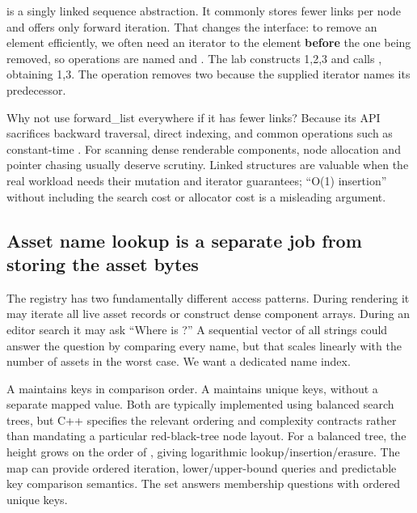  is a singly linked sequence abstraction. It commonly stores fewer links per node and offers only forward iteration. That changes the interface: to remove an element efficiently, we often need an iterator to the element \textbf{before} the one being removed, so operations are named  and . The lab constructs 1,2,3 and calls , obtaining 1,3. The operation removes two because the supplied iterator names its predecessor.

Why not use forward\_list everywhere if it has fewer links? Because its API sacrifices backward traversal, direct indexing, and common operations such as constant-time . For scanning dense renderable components, node allocation and pointer chasing usually deserve scrutiny. Linked structures are valuable when the real workload needs their mutation and iterator guarantees; ``O(1) insertion'' without including the search cost or allocator cost is a misleading argument.

\subsection{Asset name lookup is a separate job from storing the asset bytes}\label{05-engine-i-ch005-asset-name-lookup-is-a-separate-job-from-storing-the-asset-bytes}

\hypertarget{05-engine-i-ch005-asset-name-lookup-is-a-separate-job-from-storing-the-asset-bytes}{}

The registry has two fundamentally different access patterns. During rendering it may iterate all live asset records or construct dense component arrays. During an editor search it may ask ``Where is ?'' A sequential vector of all strings could answer the question by comparing every name, but that scales linearly with the number of assets in the worst case. We want a dedicated name index.

A  maintains keys in comparison order. A  maintains unique keys, without a separate mapped value. Both are typically implemented using balanced search trees, but C++ specifies the relevant ordering and complexity contracts rather than mandating a particular red-black-tree node layout. For a balanced tree, the height grows on the order of , giving logarithmic lookup/insertion/erasure. The map can provide ordered iteration, lower/upper-bound queries and predictable key comparison semantics. The set answers membership questions with ordered unique keys.

